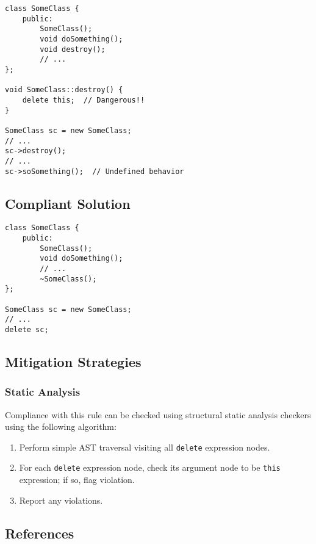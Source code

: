 \begin{verbatim}
class SomeClass {
    public:
        SomeClass();
        void doSomething();
        void destroy();
        // ...
};

void SomeClass::destroy() {
    delete this;  // Dangerous!!
}

SomeClass sc = new SomeClass;
// ...
sc->destroy();
// ...
sc->soSomething();  // Undefined behavior
\end{verbatim}

\subsection{Compliant Solution}

\begin{verbatim}
class SomeClass {
    public:
        SomeClass();
        void doSomething();
        // ...
        ~SomeClass();
};

SomeClass sc = new SomeClass;
// ...
delete sc;
\end{verbatim}

\subsection{Mitigation Strategies}
\subsubsection{Static Analysis} 

Compliance with this rule can be checked using structural static analysis checkers using the following algorithm:

\begin{enumerate}
\item Perform simple AST traversal visiting all {\tt delete} expression nodes.
\item For each {\tt delete} expression node, check its argument node to be {\tt this} expression; if so, flag violation.
\item Report any violations.
\end{enumerate}

\subsection{References}

